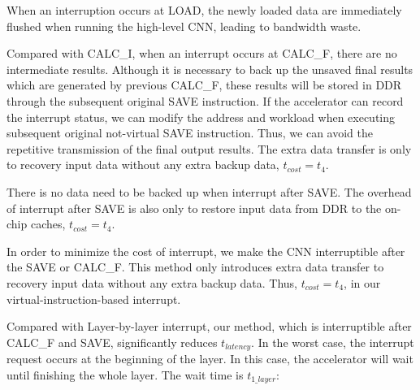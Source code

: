 When an interruption occurs at LOAD, the newly loaded data are immediately flushed when running the high-level CNN, leading to bandwidth waste.

Compared with CALC\_I, when an interrupt occurs at CALC\_F, there are no intermediate results. 
Although it is necessary to back up the unsaved final results which are generated by previous CALC\_F, these results will be stored in DDR through the subsequent original SAVE instruction.
If the accelerator can record the interrupt status, we can modify the address and workload when executing subsequent original not-virtual SAVE instruction.
Thus, we can avoid the repetitive transmission of the final output results. The extra data transfer is only to recovery input data without any extra backup data, $t_{cost} = t_4$.

There is no data need to be backed up when interrupt after SAVE. The overhead of interrupt after SAVE is also only to restore input data from DDR to the on-chip caches, $t_{cost} = t_4$.

In order to minimize the cost of interrupt, we make the CNN interruptible after the SAVE or CALC\_F. This method only introduces extra data transfer to recovery input data without any extra backup data. Thus, $t_{cost} = t_4$, in our virtual-instruction-based interrupt.


Compared with Layer-by-layer interrupt, our method, which is interruptible after CALC\_F and SAVE, significantly reduces $t_{latency}$.
In the worst case, the interrupt request occurs at the beginning of the layer. In this case, the accelerator will wait until finishing the whole layer. The wait time is $t_{1\_layer}$:

